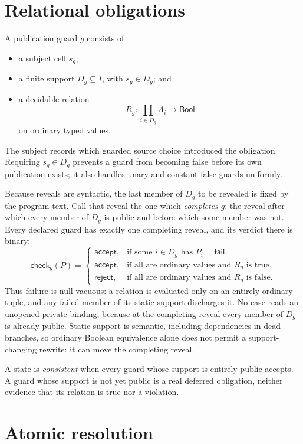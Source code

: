 \documentclass[11pt]{article}
\newcommand{\Failed}{\mathsf{fail}}
\newcommand{\Sat}{\mathsf{accept}}
\newcommand{\Reject}{\mathsf{reject}}
\begin{document}
\section{Relational obligations}

A publication guard $g$ consists of
\begin{itemize}
\item a subject cell $s_g$;
\item a finite support $D_g\subseteq I$, with $s_g\in D_g$; and
\item a decidable relation
\[
  R_g : \prod_{i\in D_g} A_i \longrightarrow \mathsf{Bool}
\]
on ordinary typed values.
\end{itemize}
The subject records which guarded source choice introduced the obligation.
Requiring $s_g\in D_g$ prevents a guard from becoming false before its own
publication exists; it also handles unary and constant-false guards uniformly.

Because reveals are syntactic, the last member of $D_g$ to be revealed is fixed
by the program text.  Call that reveal the one which \emph{completes} $g$: the
reveal after which every member of $D_g$ is public and before which some member
was not.  Every declared guard has exactly one completing reveal, and its
verdict there is binary:
\[
 \mathsf{check}_g(P)=
 \begin{cases}
   \Sat, & \text{if some $i\in D_g$ has $P_i=\Failed$},\\
   \Sat, & \text{if all are ordinary values and $R_g$ is true},\\
   \Reject, & \text{if all are ordinary values and $R_g$ is false}.
 \end{cases}
\]
Thus failure is null-vacuous: a relation is evaluated only on an entirely
ordinary tuple, and any failed member of its static support discharges it.
No case reads an unopened private binding, because at the completing reveal
every member of $D_g$ is already public.  Static support is semantic, including
dependencies in dead branches, so ordinary Boolean equivalence alone does not
permit a support-changing rewrite: it can move the completing reveal.

A state is \emph{consistent} when every guard whose support is entirely public
accepts.  A guard whose support is not yet public is a real deferred
obligation, neither evidence that its relation is true nor a violation.

\section{Atomic resolution}
\end{document}
